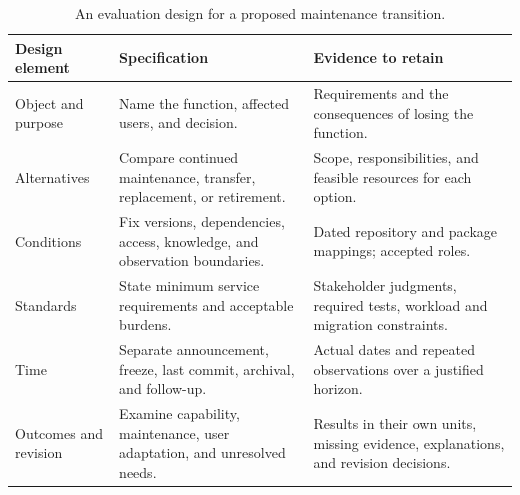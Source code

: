 \begin{table}[tbp]
\caption{An evaluation design for a proposed maintenance transition.}
\label{tab:ch8-protocol}
\centering\small\renewcommand{\arraystretch}{1.13}
\begin{tabularx}{\linewidth}{@{}>{\raggedright\arraybackslash}p{27mm}>{\raggedright\arraybackslash}X>{\raggedright\arraybackslash}X@{}}\toprule
Design element & Specification & Evidence to retain\\\midrule
Object and purpose & Name the function, affected users, and decision. & Requirements and the consequences of losing the function.\\
Alternatives & Compare continued maintenance, transfer, replacement, or retirement. & Scope, responsibilities, and feasible resources for each option.\\
Conditions & Fix versions, dependencies, access, knowledge, and observation boundaries. & Dated repository and package mappings; accepted roles.\\
Standards & State minimum service requirements and acceptable burdens. & Stakeholder judgments, required tests, workload and migration constraints.\\
Time & Separate announcement, freeze, last commit, archival, and follow-up. & Actual dates and repeated observations over a justified horizon.\\
Outcomes and revision & Examine capability, maintenance, user adaptation, and unresolved needs. & Results in their own units, missing evidence, explanations, and revision decisions.\\\bottomrule
\end{tabularx}
\end{table}
